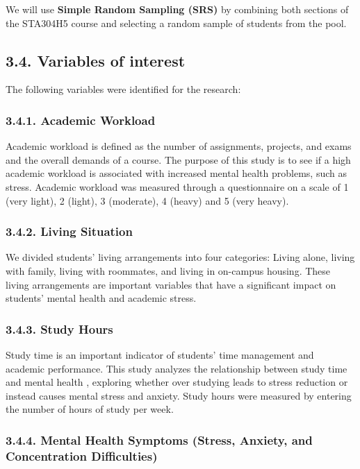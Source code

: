 \documentclass[
  letterpaper,
  DIV=11,
  numbers=noendperiod]{scrartcl}
\begin{document}
We will use \textbf{Simple Random Sampling (SRS)} by combining both
sections of the STA304H5 course and selecting a random sample of
students from the pool.

\subsection{3.4. Variables of interest}\label{variables-of-interest}

The following variables were identified for the research:

\subsubsection{3.4.1. Academic Workload}\label{academic-workload}

Academic workload is defined as the number of assignments, projects, and
exams and the overall demands of a course. The purpose of this study is
to see if a high academic workload is associated with increased mental
health problems, such as stress. Academic workload was measured through
a questionnaire on a scale of 1 (very light), 2 (light), 3 (moderate), 4
(heavy) and 5 (very heavy).

\subsubsection{3.4.2. Living Situation}\label{living-situation}

We divided students' living arrangements into four categories: Living
alone, living with family, living with roommates, and living in
on-campus housing. These living arrangements are important variables
that have a significant impact on students' mental health and academic
stress.

\subsubsection{3.4.3. Study Hours}\label{study-hours}

Study time is an important indicator of students' time management and
academic performance. This study analyzes the relationship between study
time and mental health , exploring whether over studying leads to stress
reduction or instead causes mental stress and anxiety. Study hours were
measured by entering the number of hours of study per week.

\subsubsection{3.4.4. Mental Health Symptoms (Stress, Anxiety, and
Concentration
Difficulties)}\label{mental-health-symptoms-stress-anxiety-and-concentration-difficulties}
\end{document}

